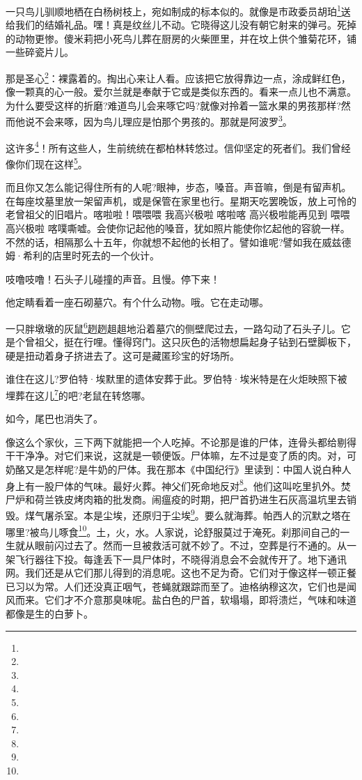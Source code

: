 \par 一只鸟儿驯顺地栖在白杨树枝上，宛如制成的标本似的。就像是市政委员胡珀\footnote{}送给我们的结婚礼品。嘿！真是纹丝儿不动。它晓得这儿没有朝它射来的弹弓。死掉的动物更惨。傻米莉把小死鸟儿葬在厨房的火柴匣里，并在坟上供个雏菊花环，铺一些碎瓷片儿。
\par 那是圣心\footnote{}：裸露着的。掏出心来让人看。应该把它放得靠边一点，涂成鲜红色，像一颗真的心一般。爱尔兰就是奉献于它或是类似东西的。看来一点儿也不满意。为什么要受这样的折磨?难道鸟儿会来啄它吗?就像对拎着一篮水果的男孩那样?然而他说不会来啄，因为鸟儿理应是怕那个男孩的。那就是阿波罗\footnote{}。
\par 这许多\footnote{}！所有这些人，生前统统在都柏林转悠过。信仰坚定的死者们。我们曾经像你们现在这样\footnote{}。
\par 而且你又怎么能记得住所有的人呢?眼神，步态，嗓音。声音嘛，倒是有留声机。在每座坟墓里放一架留声机，或是保管在家里也行。星期天吃罢晚饭，放上可怜的老曾祖父的旧唱片。喀啦啦！喂喂喂 我高兴极啦 喀啦喀 高兴极啦能再见到 喂喂 高兴极啦 喀噗嘶嘘。会使你记起他的嗓音，犹如照片能使你忆起他的容貌一样。不然的话，相隔那么十五年，你就想不起他的长相了。譬如谁呢?譬如我在威兹德姆·希利的店里时死去的一个伙计。
\par 吱噜吱噜！石头子儿碰撞的声音。且慢。停下来！
\par 他定睛看着一座石砌墓穴。有个什么动物。哦。它在走动哪。
\par 一只胖墩墩的灰鼠\footnote{}趔趔趄趄地沿着墓穴的侧壁爬过去，一路勾动了石头子儿。它是个曾祖父，挺在行哩。懂得窍门。这只灰色的活物想扁起身子钻到石壁脚板下，硬是扭动着身子挤进去了。这可是藏匿珍宝的好场所。
\par 谁住在这儿?罗伯特·埃默里的遗体安葬于此。罗伯特·埃米特是在火炬映照下被埋葬在这儿\footnote{}的吧?老鼠在转悠哪。
\par 如今，尾巴也消失了。
\par 像这么个家伙，三下两下就能把一个人吃掉。不论那是谁的尸体，连骨头都给剔得干干净净。对它们来说，这就是一顿便饭。尸体嘛，左不过是变了质的肉。对，可奶酪又是怎样呢?是牛奶的尸体。我在那本《中国纪行》里读到：中国人说白种人身上有一股尸体的气味。最好火葬。神父们死命地反对\footnote{}。他们这叫吃里扒外。焚尸炉和荷兰铁皮烤肉箱的批发商。闹瘟疫的时期，把尸首扔进生石灰高温坑里去销毁。煤气屠杀室。本是尘埃，还原归于尘埃\footnote{}。要么就海葬。帕西人的沉默之塔在哪里?被鸟儿啄食\footnote{}。土，火，水。人家说，论舒服莫过于淹死。刹那间自己的一生就从眼前闪过去了。然而一旦被救活可就不妙了。不过，空葬是行不通的。从一架飞行器往下投。每逢丢下一具尸体时，不晓得消息会不会就传开了。地下通讯网。我们还是从它们那儿得到的消息呢。这也不足为奇。它们对于像这样一顿正餐已习以为常。人们还没真正咽气，苍蝇就跟踪而至了。迪格纳穆这次，它们也是闻风而来。它们才不介意那臭味呢。盐白色的尸首，软塌塌，即将溃烂，气味和味道都像是生的白萝卜。
